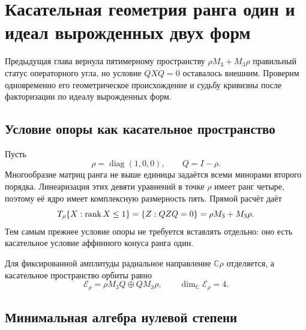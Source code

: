 \chapter{Касательная геометрия ранга один и идеал вырожденных двух форм}

Предыдущая глава вернула пятимерному пространству
\(\rho M_3+M_3\rho\) правильный статус операторного угла, но условие
\(QXQ=0\) оставалось внешним. Проверим одновременно его геометрическое
происхождение и судьбу кривизны после факторизации по идеалу вырожденных форм.

\section{Условие опоры как касательное пространство}

Пусть
\begin{equation}
 \rho=\operatorname{diag}(1,0,0),\qquad Q=I-\rho.
\end{equation}
Многообразие матриц ранга не выше единицы задаётся всеми минорами второго
порядка. Линеаризация этих девяти уравнений в точке \(\rho\) имеет ранг
четыре, поэтому её ядро имеет комплексную размерность пять. Прямой расчёт
даёт
\begin{equation}
 T_\rho\{X:\operatorname{rank} X\leq1\}
 =\{Z:QZQ=0\}
 =\rho M_3+M_3\rho.
 \label{eq:v5-rank-one-tangent}
\end{equation}
Тем самым прежнее условие опоры не требуется вставлять отдельно: оно есть
касательное условие аффинного конуса ранга один.

Для фиксированной амплитуды радиальное направление \(\mathbb C\rho\)
отделяется, а касательное пространство орбиты равно
\begin{equation}
 \mathcal E_\rho=\rho M_3Q\oplus QM_3\rho,
 \qquad \dim_{\mathbb C}\mathcal E_\rho=4.
 \label{eq:v5-rank-one-orbit-tangent}
\end{equation}

\section{Минимальная алгебра нулевой степени}

